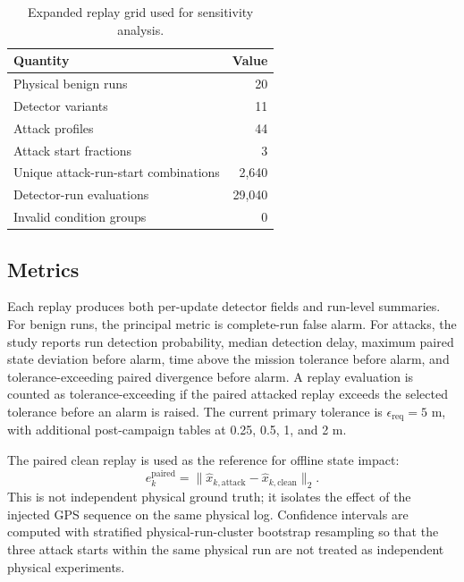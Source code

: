 \documentclass[conference]{IEEEtran}
\begin{document}
\begin{table}[t]
\centering
\caption{Expanded replay grid used for sensitivity analysis.}
\label{tab:expanded_grid}
\scriptsize
\begin{tabular}{lr}
\toprule
\textbf{Quantity} & \textbf{Value} \\
\midrule
Physical benign runs & 20 \\
Detector variants & 11 \\
Attack profiles & 44 \\
Attack start fractions & 3 \\
Unique attack-run-start combinations & 2,640 \\
Detector-run evaluations & 29,040 \\
Invalid condition groups & 0 \\
\bottomrule
\end{tabular}
\end{table}

\subsection{Metrics}

Each replay produces both per-update detector fields and run-level summaries.
For benign runs, the principal metric is complete-run false alarm. For attacks,
the study reports run detection probability, median detection delay, maximum
paired state deviation before alarm, time above the mission tolerance before
alarm, and tolerance-exceeding paired divergence before alarm. A replay
evaluation is counted as tolerance-exceeding if the paired attacked replay
exceeds the selected tolerance before an alarm is raised. The current primary
tolerance is $\epsilon_{\mathrm{req}}=5$ m, with additional post-campaign
tables at 0.25, 0.5, 1, and 2 m.

The paired clean replay is used as the reference for offline state impact:
\begin{equation}
    e_k^{\mathrm{paired}} =
    \|\hat{x}_{k,\mathrm{attack}}-\hat{x}_{k,\mathrm{clean}}\|_2.
\end{equation}
This is not independent physical ground truth; it isolates the effect of the
injected GPS sequence on the same physical log. Confidence intervals are
computed with stratified physical-run-cluster bootstrap resampling so that the
three attack starts within the same physical run are not treated as independent
physical experiments.
\end{document}
